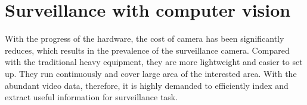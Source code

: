 \section{Surveillance with computer vision}
\label{sec:intro-cv}

With the progress of the hardware, the cost of camera has been significantly reduces, which results in the prevalence of the surveillance camera. 
Compared with the traditional heavy equipment, they are more lightweight and easier to set up.
They run continuously and cover large area of the interested area. 
With the abundant video data, therefore, it is highly demanded to efficiently index and extract useful information for surveillance task.


